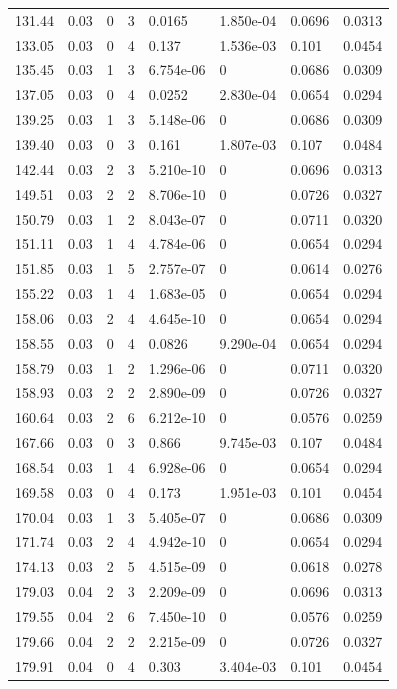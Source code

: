 \documentclass[preview]{standalone}
\begin{document}
{{{\begin{tabular}{L{1.2cm}C{1.2cm} C{0.3cm}C{0.5cm} C{1.4cm}C{1.4cm} C{1.4cm}C{1.4cm}}
  131.44  &  0.03  & 0     &  3 &  0.0165  & 1.850e-04  & 0.0696 &  0.0313   \\ 
  133.05  &  0.03  & 0     &  4 &  0.137  & 1.536e-03  & 0.101 &  0.0454   \\ 
  135.45  &  0.03  & 1     &  3 &  6.754e-06  & 0  & 0.0686 &  0.0309   \\ 
  137.05  &  0.03  & 0     &  4 &  0.0252  & 2.830e-04  & 0.0654 &  0.0294   \\ 
  139.25  &  0.03  & 1     &  3 &  5.148e-06  & 0  & 0.0686 &  0.0309   \\ 
  139.40  &  0.03  & 0     &  3 &  0.161  & 1.807e-03  & 0.107 &  0.0484   \\ 
  142.44  &  0.03  & 2     &  3 &  5.210e-10  & 0  & 0.0696 &  0.0313   \\ 
  149.51  &  0.03  & 2     &  2 &  8.706e-10  & 0  & 0.0726 &  0.0327   \\ 
  150.79  &  0.03  & 1     &  2 &  8.043e-07  & 0  & 0.0711 &  0.0320   \\ 
  151.11  &  0.03  & 1     &  4 &  4.784e-06  & 0  & 0.0654 &  0.0294   \\ 
  151.85  &  0.03  & 1     &  5 &  2.757e-07  & 0  & 0.0614 &  0.0276   \\ 
  155.22  &  0.03  & 1     &  4 &  1.683e-05  & 0  & 0.0654 &  0.0294   \\ 
  158.06  &  0.03  & 2     &  4 &  4.645e-10  & 0  & 0.0654 &  0.0294   \\ 
  158.55  &  0.03  & 0     &  4 &  0.0826  & 9.290e-04  & 0.0654 &  0.0294   \\ 
  158.79  &  0.03  & 1     &  2 &  1.296e-06  & 0  & 0.0711 &  0.0320   \\ 
  158.93  &  0.03  & 2     &  2 &  2.890e-09  & 0  & 0.0726 &  0.0327   \\ 
  160.64  &  0.03  & 2     &  6 &  6.212e-10  & 0  & 0.0576 &  0.0259   \\ 
  167.66  &  0.03  & 0     &  3 &  0.866  & 9.745e-03  & 0.107 &  0.0484   \\ 
  168.54  &  0.03  & 1     &  4 &  6.928e-06  & 0  & 0.0654 &  0.0294   \\ 
  169.58  &  0.03  & 0     &  4 &  0.173  & 1.951e-03  & 0.101 &  0.0454   \\ 
  170.04  &  0.03  & 1     &  3 &  5.405e-07  & 0  & 0.0686 &  0.0309   \\ 
  171.74  &  0.03  & 2     &  4 &  4.942e-10  & 0  & 0.0654 &  0.0294   \\ 
  174.13  &  0.03  & 2     &  5 &  4.515e-09  & 0  & 0.0618 &  0.0278   \\ 
  179.03  &  0.04  & 2     &  3 &  2.209e-09  & 0  & 0.0696 &  0.0313   \\ 
  179.55  &  0.04  & 2     &  6 &  7.450e-10  & 0  & 0.0576 &  0.0259   \\ 
  179.66  &  0.04  & 2     &  2 &  2.215e-09  & 0  & 0.0726 &  0.0327   \\ 
  179.91  &  0.04  & 0     &  4 &  0.303  & 3.404e-03  & 0.101 &  0.0454   \\ 
\hline 
\end{tabular} 

}}}
\end{document}
